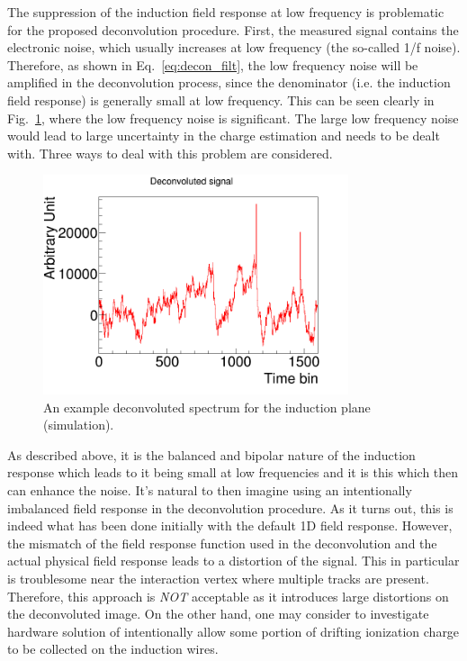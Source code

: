 The suppression of the induction field response at low frequency is problematic for the
proposed deconvolution procedure. First,  the measured signal contains the electronic noise, 
which usually increases at low frequency (the so-called 1/f noise). Therefore, as shown in 
Eq.~\eqref{eq:decon_filt}, the low frequency noise will be amplified in the deconvolution 
process, since the denominator (i.e. the induction field response) is generally small at 
low frequency. This can be seen clearly in Fig.~\ref{fig:decon_example}, where the low frequency noise
is significant. The large low frequency noise would lead to large uncertainty 
in the charge estimation and needs to be dealt with. Three ways to deal with this problem 
are considered. 

\begin{figure}[htb]
\centering
\includegraphics[width=0.8\textwidth]{figures/decon_example.png}
\caption{An example deconvoluted spectrum for the induction plane (simulation).}
\label{fig:decon_example}
\end{figure}



As described above, it is the balanced and bipolar nature of the
induction response which leads to it being small at low frequencies
and it is this which then can enhance the noise.
It's natural to then imagine using an intentionally imbalanced field
response in the deconvolution procedure.
As it turns out, this is indeed what has been done initially with the default 1D field response. 
However, the mismatch of the field response function
used in the deconvolution and the actual physical field response 
leads to a distortion of the signal. This in particular is troublesome
near the interaction vertex where multiple tracks are present. 
Therefore, this approach is {\it NOT} acceptable as it introduces large distortions
on the deconvoluted image. On the other hand, one may consider to investigate 
hardware solution of intentionally allow some portion of drifting ionization charge 
to be collected on the induction wires. 

